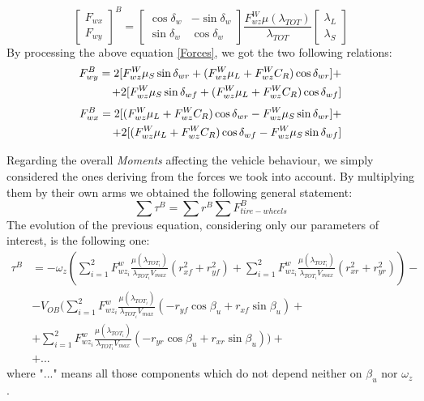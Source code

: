 \begin{equation} \label{Forces}
\begin{bmatrix}
F_{wx} \\
F_{wy}
\end{bmatrix}^{B} =
\begin{bmatrix}
\cos\delta_{w} & -\sin\delta_{w} \\
\sin\delta_{w} & \cos\delta_{w}
\end{bmatrix}
\frac{F_{wz}^{W} \mu(\lambda_{TOT})}{\lambda_{TOT}}
\begin{bmatrix}
\lambda_{L} \\
\lambda_{S}
\end{bmatrix}
\end{equation}
By processing the above equation \ref{Forces}, we got the two following relations:
\begin{equation} \label{F_{wy}}
\begin{split}
F_{wy}^{B} = 2 [F_{wz}^{W} \mu_{S}\sin\delta_{wr} + (F_{wz}^{W} \mu_{L} + F_{wz}^{W} C_{R}) \cos\delta_{wr}] + \\ + 2 [F_{wz}^{W} \mu_{S}\sin\delta_{wf} + (F_{wz}^{W} \mu_{L} + F_{wz}^{W} C_{R})\cos\delta_{wf}]
\end{split}
\end{equation}
\begin{equation} \label{F_{wx}}
\begin{split}
F_{wx}^{B} = 2 [(F_{wz}^{W} \mu_{L} + F_{wz}^{W} C_{R})\cos\delta_{wr} - F_{wz}^{W} \mu_{S}\sin\delta_{wr}] + \\ + 2 [(F_{wz}^{W} \mu_{L} + F_{wz}^{W} C_{R})\cos\delta_{wf} - F_{wz}^{W} \mu_{S}\sin\delta_{wf}]
\end{split}
\end{equation}

Regarding the overall \textit{Moments} affecting the vehicle behaviour, we simply considered the ones deriving from the forces we took into account. By multiplying them by their own arms we obtained the following general statement:
\begin{equation}
\sum \tau^{B} = \sum r^{B} \sum F_{tire-wheels}^{B}
\end{equation}
The evolution of the previous equation, considering only our parameters of interest, is the following one:
\begin{equation}
\begin{split}
\tau^{B} &= -\omega_{z}(\sum_{i=1}^{2} F_{wz_{i}}^{w} \frac{\mu(\lambda_{TOT_{i}})}{\lambda_{TOT_{i}} V_{max}} (r_{xf}^{2} + r_{yf}^{2}) + \sum_{i=1}^{2} F_{wz_{i}}^{w} \frac{\mu(\lambda_{TOT_{i}})}{\lambda_{TOT_{i}} V_{max}} (r_{xr}^{2} + r_{yr}^{2})) - \\ &- V_{OB}(\sum_{i=1}^{2} F_{wz_{i}}^{w} \frac{\mu(\lambda_{TOT_{i}})}{\lambda_{TOT_{i}} V_{max}} (- r_{yf} \cos \beta_{u} + r_{xf} \sin\beta_{u}) + \\ & + \sum_{i=1}^{2} F_{wz_{i}}^{w} \frac{\mu(\lambda_{TOT_{i}})}{\lambda_{TOT_{i}} V_{max}} (- r_{yr} \cos \beta_{u} + r_{xr} \sin\beta_{u})) + \\ &+ ...
\end{split}
\end{equation}
where "$ ... $" means all those components which do not depend neither on $\beta_{u}$ nor $\omega_{z}$.
